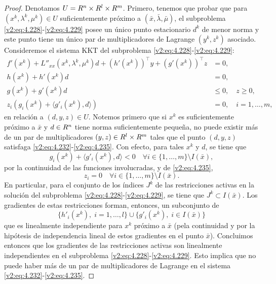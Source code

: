 \begin{proof}
    Denotamos $U = R^n \times R^l \times R^m$. Primero, tenemos que probar que para $(x^k, \lambda^k, \mu^k) \in U$ suficientemente próximo a $(\bar{x}, \bar{\lambda}, \bar{\mu})$, el subproblema \eqref{v2:eq:4.228}-\eqref{v2:eq:4.229} posee un único punto estacionario $d^k$ de menor norma y este punto tiene un único par de multiplicadores de Lagrange $(y^k, z^k)$ asociado. Consideremos el sistema KKT del subproblema \eqref{v2:eq:4.228}-\eqref{v2:eq:4.229}:
    \begin{align}
        f'(x^k) + L''_{xx}(x^k, \lambda^k, \mu^k)d + (h'(x^k))^\top y + (g'(x^k))^\top z &= 0, \label{v2:eq:4.232} \\
        h(x^k) + h'(x^k)d &= 0, \label{v2:eq:4.233} \\
        g(x^k) + g'(x^k)d &\le 0, \quad z \ge 0, \label{v2:eq:4.234} \\
        z_i(g_i(x^k) + \langle g'_i(x^k), d \rangle) &= 0, \quad i = 1, \dots, m, \label{v2:eq:4.235}
    \end{align}
    en relación a $(d, y, z) \in U$. Notemos primero que si $x^k$ es suficientemente próximo a $\bar{x}$ y $d \in R^n$ tiene norma suficientemente pequeña, no puede existir más de un par de multiplicadores $(y, z) \in R^l \times R^m$ tales que el punto $(d, y, z)$ satisfaga \eqref{v2:eq:4.232}-\eqref{v2:eq:4.235}. Con efecto, para tales $x^k$ y $d$, se tiene que
    \[
        g_i(x^k) + \langle g'_i(x^k), d \rangle < 0 \quad \forall i \in \{1, \dots, m\} \setminus I(\bar{x}),
    \]
    por la continuidad de las funciones involucradas, y de \eqref{v2:eq:4.235},
    \[
        z_i = 0 \quad \forall i \in \{1, \dots, m\} \setminus I(\bar{x}).
    \]
    En particular, para el conjunto de los índices $J^k$ de las restricciones activas en la solución del subproblema \eqref{v2:eq:4.228}-\eqref{v2:eq:4.229}, se tiene que $J^k \subset I(\bar{x})$. Los gradientes de estas restricciones forman, entonces, un subconjunto de
    \[
        \{h'_i(x^k), \; i = 1, \dots, l\} \cup \{g'_i(x^k), \; i \in I(\bar{x})\}
    \]
    que es linealmente independiente para $x^k$ próximo a $\bar{x}$ (pela continuidad y por la hipótesis de independencia lineal de estos gradientes en el punto $\bar{x}$). Concluimos entonces que los gradientes de las restricciones activas son linealmente independientes en el subproblema \eqref{v2:eq:4.228}-\eqref{v2:eq:4.229}. Esto implica que no puede haber más de un par de multiplicadores de Lagrange en el sistema \eqref{v2:eq:4.232}-\eqref{v2:eq:4.235}.


\end{proof}
